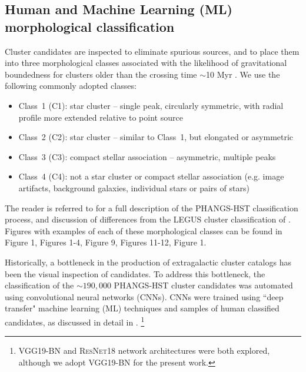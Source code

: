 \documentclass[linenumbers]{aastex63}
\begin{document}
\subsection{Human and Machine Learning (ML) morphological classification}\label{ssec:classification}
Cluster candidates are inspected to eliminate spurious sources, and to place them into three morphological classes associated
with the likelihood of gravitational boundedness for clusters older than {the crossing time} $\sim$10 Myr \citep{whitmore_antennae_2010, gieles_distinction_2011, bastian_stellar_2012, fall_similarities_2012, chandar_star-cluster_2014, grasha_spatial_2015, adamo_legacy_2017, krumholz_star_2019, cook_star_2019, wei_deep_2020}.  We use the following commonly adopted classes:
\begin{itemize}
    \item Class~1 (C1): star cluster -- single peak, circularly symmetric, with radial profile more extended relative to point source
    \item Class~2 (C2): star cluster -- similar to Class~1, but elongated or asymmetric 
    \item Class~3 (C3): compact stellar association -- asymmetric, multiple peaks \item Class~4 (C4): not a star cluster or compact stellar association (e.g. image artifacts, background galaxies, individual stars or pairs of stars) 
\end{itemize}
The reader is referred to \citet{whitmore_star_2021} for a full description of the PHANGS-HST classification process, and discussion of differences from the LEGUS cluster classification of \citet{adamo_legacy_2017}.  Figures with examples of each of these morphological classes can be found in \citet{wei_deep_2020} Figure 1, \citet{whitmore_star_2021} Figures 1-4, \citet{lee_phangs-hst_2022} Figure 9, \citet{deger_bright_2022} Figures 11-12, \citet{hannon_star_2023} Figure 1.

Historically, a bottleneck in the production of extragalactic cluster catalogs has been the visual inspection of candidates.
To address this bottleneck, the classification of the $\sim190,000$ PHANGS-HST cluster candidates was automated using convolutional neural networks (CNNs).  CNNs were trained using ``deep transfer" machine learning (ML) techniques and samples of human classified candidates, as discussed in detail in \cite{wei_deep_2020, whitmore_star_2021, hannon_star_2023}. \footnote{\textsc{VGG19-BN} \citep{simonyan_very_2015} and \textsc{ResNet18} \citep{he_deep_2015} network architectures were both explored, although we adopt \textsc{VGG19-BN} for the present work.}
\end{document}
